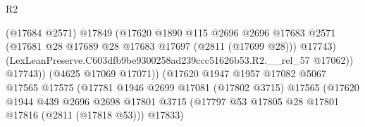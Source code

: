 \begin{lexlean}{R2}
\begin{coremodule}
                                              (@17684 @2571)
                                              @17849
                                              (@17620
                                                @1890
                                                @115
                                                @2696
                                                @2696
                                                @17683
                                                @2571
                                                (@17681
                                                  @28
                                                  @17689
                                                  @28
                                                  @17683
                                                  @17697
                                                  (@2811 (@17699 @28)))
                                                @17743)
                                              (LexLeanPreserve.C603dfb9be9300258ad239ccc51626b53.R2.__rel_57
                                                @17062))
                                            @17743))
                                        (@4625 @17069 @17071))
                                      (@17620
                                        @1947
                                        @1957
                                        @17082
                                        @5067
                                        @17565
                                        @17575
                                        (@17781
                                          @1946
                                          @2699
                                          @17081
                                          (@17802 @3715)
                                          @17565
                                          (@17620
                                            @1944
                                            @439
                                            @2696
                                            @2698
                                            @17801
                                            @3715
                                            (@17797
                                              @53
                                              @17805
                                              @28
                                              @17801
                                              @17816
                                              (@2811 (@17818 @53)))
                                            @17833)

\end{coremodule}
\end{lexlean}
